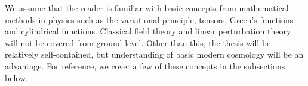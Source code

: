 






\newcommand\pert{\ALIASpert}




We assume that the reader is familiar with basic concepts from mathematical methods in physics such as the variational principle, tensors, Green's functions and cylindrical functions. Classical field theory and linear perturbation theory will not be covered from ground level. Other than this, the thesis will be relatively self-contained, but understanding of basic modern cosmology will be an advantage. 
For reference, we cover a few of these concepts in the subsections below.





















